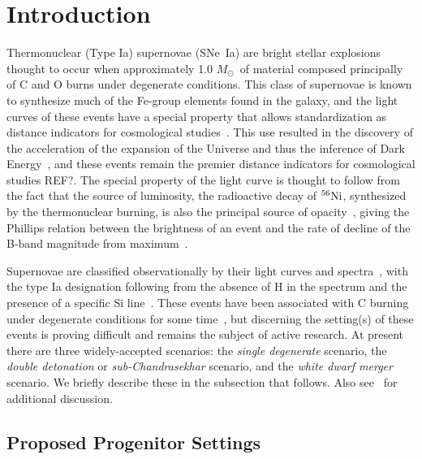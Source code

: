 \documentclass[iop,apj]{emulateapj}
\newcommand{\SNeIa}{SNe~Ia}
\newcommand{\Ni}[1]{\ensuremath{{}^{#1}{\rm Ni}}}
\newcommand{\Msun}{\ensuremath{M_\odot}}
\newcommand\blust{\bgroup\markoverwith{\textcolor{blue}{\rule[0.5ex]{2pt}{0.4pt}}}\ULon}
\begin{document}
\section{Introduction}
\label{sec:intro}
Thermonuclear (Type Ia) supernovae (\SNeIa) are bright stellar explosions
thought to occur when approximately 1.0 \Msun\ of material composed principally
of C and O burns under degenerate conditions. This class of supernovae is
known to synthesize much of the Fe-group elements found in the galaxy, and
the light curves of these events have a special property that allows
standardization \blust{of their light curves and thus use}
as distance indicators for cosmological studies~\citep{phillips:absolute}.
This use resulted in the discovery of the acceleration of the expansion of
the Universe and thus the inference of Dark
Energy~\citep{riess.filippenko.ea:observational,
perlmutter.aldering.ea:measurements,leibundgut2001}, and these events
remain the premier distance indicators for cosmological studies {\color{red} REF?}.
The special property of the light curve is thought to follow
from the fact that the source of luminosity, the radioactive decay
of \Ni{56}, synthesized by the thermonuclear burning, is also the
principal source of opacity~\citep{Pinto2001The-type-Ia-sup}, giving
the Phillips relation between the brightness of an event and the
rate of decline of the B-band magnitude from maximum~\citep{phillips:absolute}.

Supernovae are classified observationally
by their light curves and spectra~\citep{minkowski41,bertola64,porterfilippenko87,
wheelerharkness1990conf,Fili97}, with the type Ia designation following from
the absence of H in the spectrum and the presence of a specific Si
line~\citep{filippenko:optical,hillebrandt.niemeyer:type}. These events
have been associated with C burning under degenerate conditions
for some time~\citep{hoylefowler60,arnett.truran.ea:nucleosynthesis},
but discerning the setting(s) of these events is proving difficult
and remains the subject of active research. At present there are three
widely-accepted scenarios: the {\em single degenerate} scenario,
the {\em double detonation} or {\em sub-Chandrasekhar} scenario, and
the {\em white dwarf merger} scenario.
We briefly describe these in the subsection that follows.
Also see~\citet{hillebrandt.niemeyer:type,howell2011,hillebrandtetal2013,calderetal2013,roepkesim2018}
for additional discussion.

\subsection{Proposed Progenitor Settings}\label{sec:progenitors}
\end{document}
